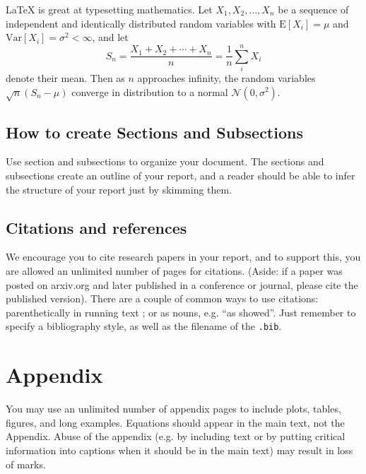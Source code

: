 \documentclass[a4paper]{article}
\begin{document}
\LaTeX{} is great at typesetting mathematics. Let $X_1, X_2, \ldots, X_n$ be a sequence of independent and identically distributed random variables with $\text{E}[X_i] = \mu$ and $\text{Var}[X_i] = \sigma^2 < \infty$, and let
\[S_n = \frac{X_1 + X_2 + \cdots + X_n}{n}
      = \frac{1}{n}\sum_{i}^{n} X_i\]
denote their mean. Then as $n$ approaches infinity, the random variables $\sqrt{n}(S_n - \mu)$ converge in distribution to a normal $\mathcal{N}(0, \sigma^2)$.


\subsection{How to create Sections and Subsections}

Use section and subsections to organize your document. The sections and subsections create an outline of your report, and a reader should be able to infer the structure of your report just by skimming them.

\subsection{Citations and references}

We encourage you to cite research papers in your report, and to support this, you are allowed an unlimited number of pages for citations. (Aside: if a paper was posted on arxiv.org and later published in a conference or journal, please cite the published version).
There are a couple of common ways to use citations: parenthetically in running text \citep{greenwade93}; or as nouns, e.g. ``as \citet{greenwade93} showed''. Just remember to specify a bibliography style, as well as the filename of the \verb|.bib|.




\section*{Appendix}

You may use an unlimited number of appendix pages to
include plots, tables, figures, and long examples. Equations should appear in the main text, not the Appendix. Abuse of the appendix (e.g. by including text or by putting critical information into captions when it should be in the main text) may result in loss of marks.
\end{document}
